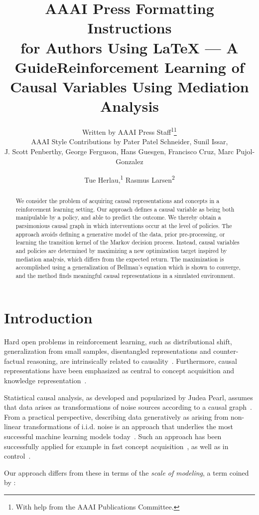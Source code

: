 \documentclass[letterpaper]{article} %
\title{AAAI Press Formatting Instructions \\for Authors Using \LaTeX{} --- A Guide}
\author{
	Written by AAAI Press Staff\textsuperscript{\rm 1}\thanks{With help from the AAAI Publications Committee.}\\
	AAAI Style Contributions by Pater Patel Schneider,
	Sunil Issar,\\
	J. Scott Penberthy,
	George Ferguson,
	Hans Guesgen,
	Francisco Cruz\equalcontrib,
	Marc Pujol-Gonzalez\equalcontrib
}
\title{Reinforcement Learning of Causal Variables Using Mediation Analysis}
\author {
	Tue Herlau,\textsuperscript{\rm 1}
	Rasmus Larsen\textsuperscript{\rm 2}
}
\begin{document}
	
	\maketitle
	
	\begin{abstract}
		We consider the problem of acquiring causal representations and concepts in a reinforcement learning setting. 
		Our approach defines a causal variable as being both manipulable by a policy, and able to predict the outcome. 
		We thereby obtain a parsimonious causal graph in which interventions occur at the level of policies.
		The approach avoids defining a generative model of the data, prior pre-processing, or learning the transition kernel of the Markov decision process. 
		Instead, causal variables and policies are determined by maximizing a new optimization target inspired by mediation analysis, which differs from the expected return. 
		The maximization is accomplished using a generalization of Bellman's equation which is shown to converge, and the method finds meaningful causal representations in a simulated environment.  
	\end{abstract}
	
	\section{Introduction} \label{introduction}
	Hard open problems in reinforcement learning, such as distributional shift, generalization from small samples, disentangled representations and counter-factual reasoning, are intrinsically related to causality~\cite{scholkopf2019causality}. Furthermore, causal representations have been emphasized as central to concept acquisition and knowledge representation~\cite{Tenenbaum1279}.
	
	Statistical causal analysis, as developed and popularized by Judea Pearl, assumes that data arises as transformations of noise sources according to a causal graph~\cite{pearl2009causality}. From a practical perspective, describing data generatively as arising from non-linear transformations of i.i.d. noise is an approach that underlies the most successful machine learning models today~\cite{shrestha2019review}. Such an approach has been successfully applied for example in fast concept acquisition~\cite{Tenenbaum1279,lake2015human}, as well as in control~\cite{deisenroth2011pilco, levin}. %
	
	Our approach differs from these in terms of the \emph{scale of modeling}, a term coined by \citet{PetJanSch17}:
	
\end{document}
